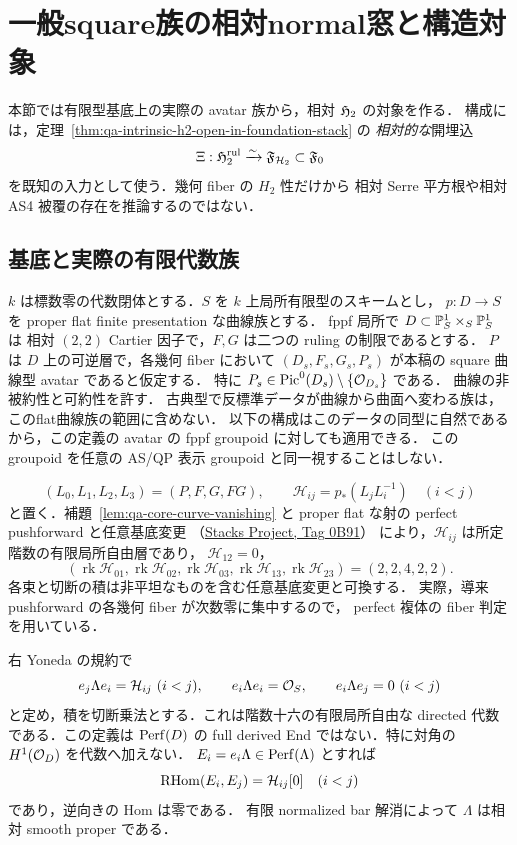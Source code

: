 
\section{一般square族の相対normal窓と構造対象}
\label{sec:qa-relative-avatar-pointed-recognition}

本節では有限型基底上の実際の avatar 族から，相対 $\mathfrak H_2$ の対象を作る．
構成には，定理~\ref{thm:qa-intrinsic-h2-open-in-foundation-stack} の
\emph{相対的な}開埋込
\[
 \Xi:\mathfrak H_2^{\mathrm{rul}}\xrightarrow{\sim}\mathfrak F_{\mathcal H_2}
 \subset\mathfrak F_0
\]
を既知の入力として使う．幾何 fiber の $H_2$ 性だけから
相対 Serre 平方根や相対 AS4 被覆の存在を推論するのではない．

\subsection{基底と実際の有限代数族}

$k$ は標数零の代数閉体とする．$S$ を $k$ 上局所有限型のスキームとし，
$p:D\to S$ を proper flat finite presentation な曲線族とする．
fppf 局所で $D\subset\mathbb P^1_S\times_S\mathbb P^1_S$ は
相対 $(2,2)$ Cartier 因子で，$F,G$ は二つの ruling の制限であるとする．
$P$ は $D$ 上の可逆層で，各幾何 fiber において
$(D_s,F_s,G_s,P_s)$ が本稿の square 曲線型 avatar であると仮定する．
特に $P_s\in\operatorname{Pic}^0(D_s)\setminus\{\mathcal O_{D_s}\}$ である．
曲線の非被約性と可約性を許す．
古典型で反標準データが曲線から曲面へ変わる族は，このflat曲線族の範囲に含めない．
以下の構成はこのデータの同型に自然であるから，この定義の
avatar の fppf groupoid に対しても適用できる．
この groupoid を任意の AS/QP 表示 groupoid と同一視することはしない．

\[
 (L_0,L_1,L_2,L_3)=(P,F,G,FG),\qquad
 \mathcal H_{ij}=p_*(L_jL_i^{-1})\quad(i<j)
\]
と置く．補題~\ref{lem:qa-core-curve-vanishing} と
proper flat な射の perfect pushforward と任意基底変更
（\href{https://stacks.math.columbia.edu/tag/0B91}{Stacks Project, Tag 0B91}）
により，$\mathcal H_{ij}$ は所定階数の有限局所自由層であり，
$\mathcal H_{12}=0$，
\[
 (\operatorname{rk}\mathcal H_{01},\operatorname{rk}\mathcal H_{02},
  \operatorname{rk}\mathcal H_{03},\operatorname{rk}\mathcal H_{13},
  \operatorname{rk}\mathcal H_{23})=(2,2,4,2,2).
\]
各束と切断の積は非平坦なものを含む任意基底変更と可換する．
実際，導来 pushforward の各幾何 fiber が次数零に集中するので，
perfect 複体の fiber 判定を用いている．

右 Yoneda の規約で
\[
 e_j\Lambda e_i=\mathcal H_{ij}\ (i<j),\qquad
 e_i\Lambda e_i=\mathcal O_S,\qquad e_i\Lambda e_j=0\ (i<j)
\]
と定め，積を切断乗法とする．これは階数十六の有限局所自由な
directed 代数である．この定義は $\operatorname{Perf}(D)$ の full derived End
ではない．特に対角の $H^1(\mathcal O_D)$ を代数へ加えない．
$E_i=e_i\Lambda\in\operatorname{Perf}(\Lambda)$ とすれば
\[
 \operatorname{RHom}(E_i,E_j)=\mathcal H_{ij}[0]\quad(i<j)
\]
であり，逆向きの Hom は零である．
有限 normalized bar 解消によって $\Lambda$ は相対 smooth proper である．

